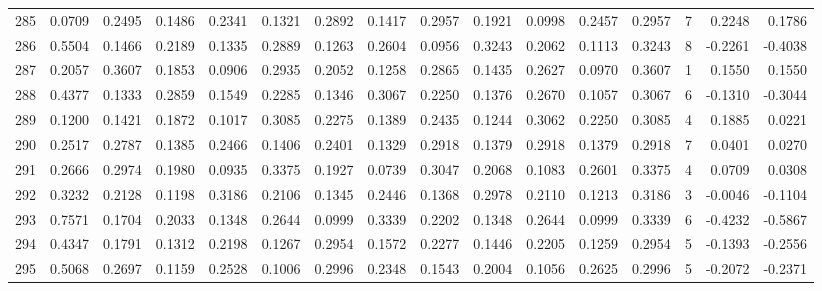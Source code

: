 \begin{tabular}{lrrrrrrrrrrrrrrr}
285 &      0.0709 &  0.2495 &  0.1486 &  0.2341 &  0.1321 &  0.2892 &  0.1417 &  0.2957 &  0.1921 &  0.0998 &   0.2457 &     0.2957 &      7 &                    0.2248 &                     0.1786 \\
286 &      0.5504 &  0.1466 &  0.2189 &  0.1335 &  0.2889 &  0.1263 &  0.2604 &  0.0956 &  0.3243 &  0.2062 &   0.1113 &     0.3243 &      8 &                   -0.2261 &                    -0.4038 \\
287 &      0.2057 &  0.3607 &  0.1853 &  0.0906 &  0.2935 &  0.2052 &  0.1258 &  0.2865 &  0.1435 &  0.2627 &   0.0970 &     0.3607 &      1 &                    0.1550 &                     0.1550 \\
288 &      0.4377 &  0.1333 &  0.2859 &  0.1549 &  0.2285 &  0.1346 &  0.3067 &  0.2250 &  0.1376 &  0.2670 &   0.1057 &     0.3067 &      6 &                   -0.1310 &                    -0.3044 \\
289 &      0.1200 &  0.1421 &  0.1872 &  0.1017 &  0.3085 &  0.2275 &  0.1389 &  0.2435 &  0.1244 &  0.3062 &   0.2250 &     0.3085 &      4 &                    0.1885 &                     0.0221 \\
290 &      0.2517 &  0.2787 &  0.1385 &  0.2466 &  0.1406 &  0.2401 &  0.1329 &  0.2918 &  0.1379 &  0.2918 &   0.1379 &     0.2918 &      7 &                    0.0401 &                     0.0270 \\
291 &      0.2666 &  0.2974 &  0.1980 &  0.0935 &  0.3375 &  0.1927 &  0.0739 &  0.3047 &  0.2068 &  0.1083 &   0.2601 &     0.3375 &      4 &                    0.0709 &                     0.0308 \\
292 &      0.3232 &  0.2128 &  0.1198 &  0.3186 &  0.2106 &  0.1345 &  0.2446 &  0.1368 &  0.2978 &  0.2110 &   0.1213 &     0.3186 &      3 &                   -0.0046 &                    -0.1104 \\
293 &      0.7571 &  0.1704 &  0.2033 &  0.1348 &  0.2644 &  0.0999 &  0.3339 &  0.2202 &  0.1348 &  0.2644 &   0.0999 &     0.3339 &      6 &                   -0.4232 &                    -0.5867 \\
294 &      0.4347 &  0.1791 &  0.1312 &  0.2198 &  0.1267 &  0.2954 &  0.1572 &  0.2277 &  0.1446 &  0.2205 &   0.1259 &     0.2954 &      5 &                   -0.1393 &                    -0.2556 \\
295 &      0.5068 &  0.2697 &  0.1159 &  0.2528 &  0.1006 &  0.2996 &  0.2348 &  0.1543 &  0.2004 &  0.1056 &   0.2625 &     0.2996 &      5 &                   -0.2072 &                    -0.2371 \\

\end{tabular}
